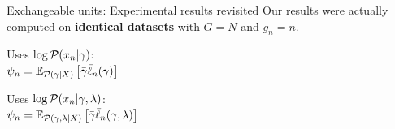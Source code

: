 \begin{frame}{Exchangeable units: Experimental results revisited}
    Our results were actually computed on \textbf{identical datasets}
    with $G = N$ and $g_n=n$.

    \begin{center}
    \begin{minipage}{0.34\textwidth}
        Uses $\log \mathcal{P}(x_n \vert \gamma)$:\\
        $\psi_n = \mathbb{E}_{\mathcal{P}(\gamma \vert X)}\left[ \bar{\gamma} \bar{\ell}_n(\gamma)\right]\,$

    \end{minipage}
    \begin{minipage}{0.65\textwidth}
        \LowDimAccuracyGraph{}
    \end{minipage}

    \begin{minipage}{0.34\textwidth}
        Uses $\log \mathcal{P}(x_n \vert \gamma, \lambda)$:\\
        $\psi_n = \mathbb{E}_{\mathcal{P}(\gamma,\lambda \vert X)}\left[ \bar{\gamma} \bar{\ell}_n(\gamma, \lambda)\right]\,$



    \end{minipage}
    \begin{minipage}{0.65\textwidth}
        \HighDimAccuracyGraph{}
    \end{minipage}
\end{center}
\end{frame}




